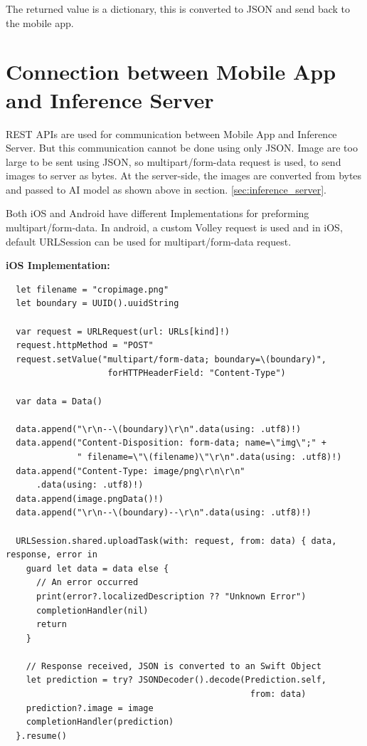 \documentclass[../Report.tex]{subfiles}
\begin{document}
The returned value is a dictionary, this is converted to JSON and send back to the mobile app.

\section{Connection between Mobile App and Inference Server}

REST APIs are used for communication between Mobile App and Inference Server. But this communication cannot be done using only JSON.
Image are too large to be sent using JSON, so multipart/form-data request is used, to send images to server as bytes. At the server-side,
the images are converted from bytes and passed to AI model as shown above in section. \ref{sec:inference_server}.\par

Both iOS and Android have different Implementations for preforming multipart/form-data. In android, a custom Volley\cite{volloy} request 
is used and in iOS, default URLSession can be used for multipart/form-data request.\par

\noindent \textbf{iOS Implementation:}
\begin{verbatim}
  let filename = "cropimage.png"
  let boundary = UUID().uuidString
        
  var request = URLRequest(url: URLs[kind]!)
  request.httpMethod = "POST"
  request.setValue("multipart/form-data; boundary=\(boundary)", 
                    forHTTPHeaderField: "Content-Type")
        
  var data = Data()
        
  data.append("\r\n--\(boundary)\r\n".data(using: .utf8)!)
  data.append("Content-Disposition: form-data; name=\"img\";" + 
              " filename=\"\(filename)\"\r\n".data(using: .utf8)!)
  data.append("Content-Type: image/png\r\n\r\n"
      .data(using: .utf8)!)
  data.append(image.pngData()!)
  data.append("\r\n--\(boundary)--\r\n".data(using: .utf8)!)
        
  URLSession.shared.uploadTask(with: request, from: data) { data, response, error in
    guard let data = data else {
      // An error occurred
      print(error?.localizedDescription ?? "Unknown Error")
      completionHandler(nil)
      return
    }
    
    // Response received, JSON is converted to an Swift Object
    let prediction = try? JSONDecoder().decode(Prediction.self, 
                                                from: data)
    prediction?.image = image
    completionHandler(prediction)
  }.resume()
\end{verbatim}
 ~\par
\end{document}
